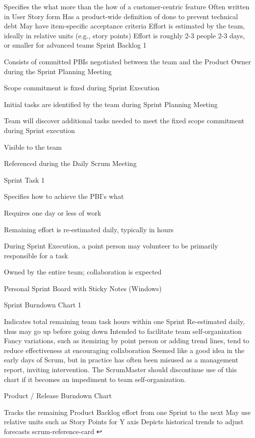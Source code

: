 Specifies the what more than the how of a customer-centric feature
Often written in User Story form
Has a product-wide definition of done to prevent technical debt
May have item-specific acceptance criteria
Effort is estimated by the team, ideally in relative units (e.g., story points)
Effort is roughly 2-3 people 2-3 days, or smaller for advanced teams
Sprint Backlog 1


Consists of committed PBIs negotiated between the team and the Product Owner during the Sprint Planning Meeting

Scope commitment is fixed during Sprint Execution

Initial tasks are identified by the team during Sprint Planning Meeting

Team will discover additional tasks needed to meet the fixed scope commitment during Sprint execution

Visible to the team

Referenced during the Daily Scrum Meeting

Sprint Task 1


Specifies how to achieve the PBI’s what

Requires one day or less of work

Remaining effort is re-estimated daily, typically in hours

During Sprint Execution, a point person may volunteer to be primarily responsible for a task

Owned by the entire team; collaboration is expected

Personal Sprint Board with Sticky Notes (Windows)


Sprint Burndown Chart 1


Indicates total remaining team task hours within one Sprint
Re-estimated daily, thus may go up before going down
Intended to facilitate team self-organization
Fancy variations, such as itemizing by point person or adding trend lines, tend to reduce effectiveness at encouraging collaboration
Seemed like a good idea in the early days of Scrum, but in practice has often been misused as a management report, inviting intervention. The ScrumMaster should discontinue use of this chart if it becomes an impediment to team self-organization.


Product / Release Burndown Chart


Tracks the remaining Product Backlog effort from one Sprint to the next
May use relative units such as Story Points for Y axis
Depicts historical trends to adjust forecasts
scrum-reference-card ↩

